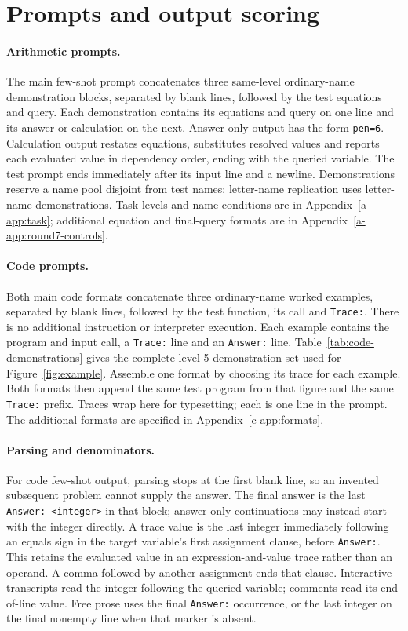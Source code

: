\section{Prompts and output scoring}
\label{app:prompts-scoring}

\paragraph{Arithmetic prompts.} The main few-shot prompt concatenates three
same-level ordinary-name demonstration blocks, separated by blank lines, followed
by the test equations and query. Each demonstration contains its equations and
query on one line and its answer or calculation on the next. Answer-only output
has the form \texttt{pen=6}. Calculation output restates equations, substitutes
resolved values and reports each evaluated value in dependency order, ending
with the queried variable. The test prompt ends immediately after its input line
and a newline. Demonstrations reserve a name pool disjoint from test names;
letter-name replication uses letter-name demonstrations. Task levels and
name conditions are in Appendix~\ref{a-app:task}; additional equation and final-query
formats are in Appendix~\ref{a-app:round7-controls}.

\paragraph{Code prompts.} Both main code formats concatenate three ordinary-name
worked examples, separated by blank lines, followed by the test function, its
call and \texttt{Trace:}. There is no additional instruction or interpreter
execution. Each example contains the program and input call, a \texttt{Trace:}
line and an \texttt{Answer:} line. Table~\ref{tab:code-demonstrations} gives the
complete level-5 demonstration set used for Figure~\ref{fig:example}. Assemble
one format by choosing its trace for each example. Both formats then append the
same test program from that figure and the same \texttt{Trace:} prefix. Traces
wrap here for typesetting; each is one line in the prompt. The additional formats
are specified in Appendix~\ref{c-app:formats}.



\paragraph{Parsing and denominators.} For code few-shot output, parsing stops at
the first blank line, so an invented subsequent problem cannot supply the answer.
The final answer is the last \texttt{Answer: <integer>} in that block; answer-only
continuations may instead start with the integer directly. A trace value is the
last integer immediately following an equals sign in the target variable's
first assignment clause, before \texttt{Answer:}. This retains the evaluated
value in an expression-and-value trace rather than an operand. A comma followed
by another assignment ends that clause. Interactive transcripts read the integer
following the queried variable; comments read its end-of-line value. Free prose
uses the final \texttt{Answer:} occurrence, or the last integer on the final
nonempty line when that marker is absent.

